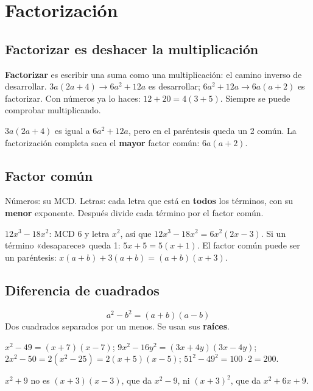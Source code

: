 \section{Factorización}

\subsection{Factorizar es deshacer la multiplicación}
\textbf{Factorizar} es escribir una suma como una multiplicación: el camino inverso de desarrollar. $3a(2a + 4) \to 6a^2 + 12a$ es desarrollar; $6a^2 + 12a \to 6a(a + 2)$ es factorizar. Con números ya lo haces: $12 + 20 = 4(3 + 5)$. Siempre se puede comprobar multiplicando.
\begin{ojo} $3a(2a + 4)$ es igual a $6a^2 + 12a$, pero en el paréntesis queda un 2 común. La factorización completa saca el \textbf{mayor} factor común: $6a(a + 2)$.\end{ojo}

\subsection{Factor común}
\begin{clave} Números: su MCD. Letras: cada letra que está en \textbf{todos} los términos, con su \textbf{menor} exponente. Después divide cada término por el factor común.\end{clave}
\begin{ejemplo} $12x^3 - 18x^2$: MCD 6 y letra $x^2$, así que $12x^3 - 18x^2 = 6x^2(2x - 3)$. Si un término «desaparece» queda 1: $5x + 5 = 5(x + 1)$. El factor común puede ser un paréntesis: $x(a + b) + 3(a + b) = (a + b)(x + 3)$.\end{ejemplo}

\subsection{Diferencia de cuadrados}
\begin{clave} \[ a^2 - b^2 = (a + b)(a - b) \] Dos cuadrados separados por un menos. Se usan sus \textbf{raíces}.\end{clave}
\begin{ejemplo} $x^2 - 49 = (x + 7)(x - 7)$; $9x^2 - 16y^2 = (3x + 4y)(3x - 4y)$; $2x^2 - 50 = 2(x^2 - 25) = 2(x + 5)(x - 5)$; $51^2 - 49^2 = 100\cdot 2 = 200$.\end{ejemplo}
\begin{ojo} $x^2 + 9$ no es $(x + 3)(x - 3)$, que da $x^2 - 9$, ni $(x + 3)^2$, que da $x^2 + 6x + 9$.\end{ojo}

